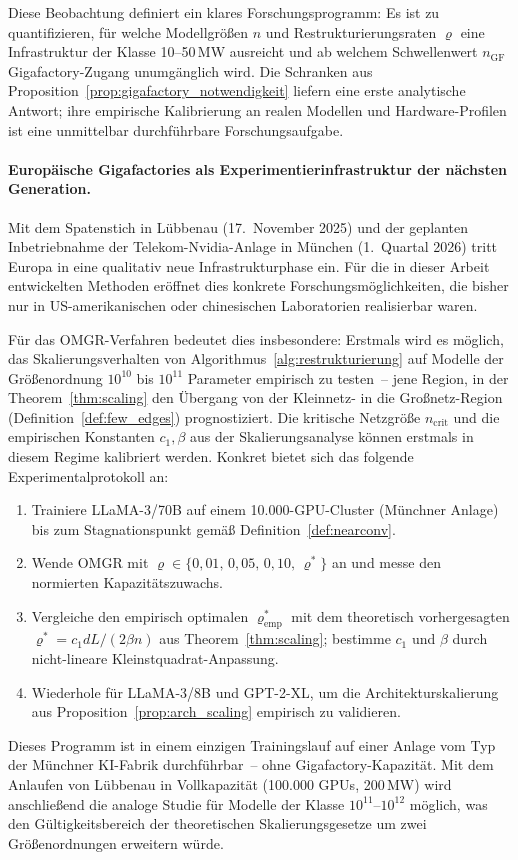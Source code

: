 \documentclass[12pt, a4paper, openany]{report}
\begin{document}
Diese Beobachtung definiert ein klares Forschungsprogramm: Es ist zu
quantifizieren, für welche Modellgrößen $n$ und Restrukturierungsraten
$\varrho$ eine Infrastruktur der Klasse 10--50\,MW ausreicht und ab
welchem Schwellenwert $n_{\mathrm{GF}}$ Gigafactory-Zugang unumgänglich
wird.  Die Schranken aus Proposition~\ref{prop:gigafactory_notwendigkeit}
liefern eine erste analytische Antwort; ihre empirische Kalibrierung an
realen Modellen und Hardware-Profilen ist eine unmittelbar
durchführbare Forschungsaufgabe.

\paragraph{Europäische Gigafactories als Experimentierinfrastruktur
  der nächsten Generation.}
Mit dem Spatenstich in Lübbenau (17.~November 2025) und der geplanten
Inbetriebnahme der Telekom-Nvidia-Anlage in München (1.~Quartal 2026)
tritt Europa in eine qualitativ neue Infrastrukturphase ein.  Für die
in dieser Arbeit entwickelten Methoden eröffnet dies konkrete
Forschungsmöglichkeiten, die bisher nur in US-amerikanischen oder
chinesischen Laboratorien realisierbar waren.

Für das OMGR-Verfahren bedeutet dies insbesondere: Erstmals wird es
möglich, das Skalierungsverhalten von
Algorithmus~\ref{alg:restrukturierung} auf Modelle der Größenordnung
$10^{10}$ bis $10^{11}$ Parameter empirisch zu testen~-- jene Region,
in der Theorem~\ref{thm:scaling} den Übergang von der Kleinnetz- in die
Großnetz-Region (Definition~\ref{def:few_edges}) prognostiziert.  Die
kritische Netzgröße $n_{\mathrm{crit}}$ und die empirischen Konstanten
$c_1, \beta$ aus der Skalierungsanalyse können erstmals in diesem Regime
kalibriert werden.  Konkret bietet sich das folgende
Experimentalprotokoll an:
\begin{enumerate}[label=(\roman*)]
  \item Trainiere LLaMA-3/70B auf einem 10.000-GPU-Cluster (Münchner
    Anlage) bis zum Stagnationspunkt gemäß
    Definition~\ref{def:nearconv}.
  \item Wende OMGR mit
    $\varrho \in \{0{,}01,\, 0{,}05,\, 0{,}10,\, \varrho^*\}$ an und
    messe den normierten Kapazitätszuwachs.
  \item Vergleiche den empirisch optimalen $\varrho_{\mathrm{emp}}^*$ mit
    dem theoretisch vorhergesagten
    $\varrho^* = c_1 dL / (2\beta n)$ aus Theorem~\ref{thm:scaling};
    bestimme $c_1$ und $\beta$ durch nicht-lineare
    Kleinstquadrat-Anpassung.
  \item Wiederhole für LLaMA-3/8B und GPT-2-XL, um die
    Architekturskalierung aus Proposition~\ref{prop:arch_scaling}
    empirisch zu validieren.
\end{enumerate}
Dieses Programm ist in einem einzigen Trainingslauf auf einer Anlage
vom Typ der Münchner KI-Fabrik durchführbar~-- ohne Gigafactory-Kapazität.
Mit dem Anlaufen von Lübbenau in Vollkapazität (100.000 GPUs, 200\,MW)
wird anschließend die analoge Studie für Modelle der
Klasse $10^{11}$--$10^{12}$ möglich, was den Gültigkeitsbereich der
theoretischen Skalierungsgesetze um zwei Größenordnungen erweitern würde.
\end{document}
